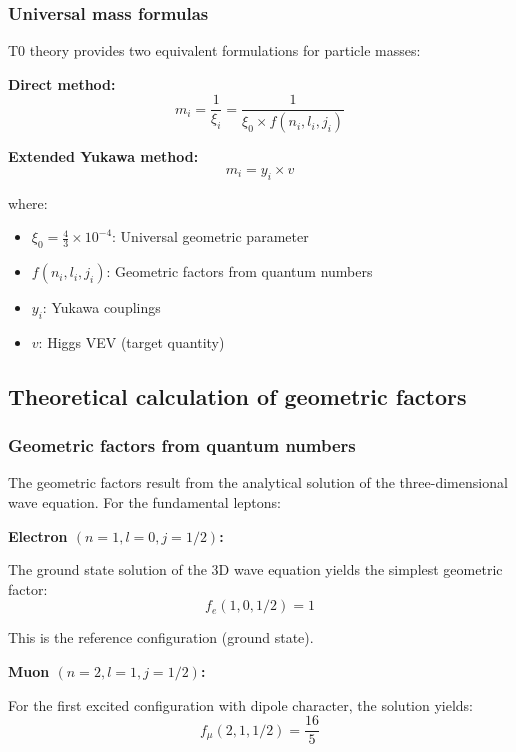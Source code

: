 \subsubsection{Universal mass formulas}

T0 theory provides two equivalent formulations for particle masses:

\textbf{Direct method:}
\begin{equation}
	m_i = \frac{1}{\xi_i} = \frac{1}{\xi_0 \times f(n_i, l_i, j_i)}
	\label{eq:direct_mass_formula}
\end{equation}

\textbf{Extended Yukawa method:}
\begin{equation}
	m_i = y_i \times v
	\label{eq:yukawa_mass_formula}
\end{equation}

where:
\begin{itemize}
	\item $\xi_0 = \frac{4}{3} \times 10^{-4}$: Universal geometric parameter
	\item $f(n_i, l_i, j_i)$: Geometric factors from quantum numbers
	\item $y_i$: Yukawa couplings
	\item $v$: Higgs VEV (target quantity)
\end{itemize}

\subsection{Theoretical calculation of geometric factors}

\subsubsection{Geometric factors from quantum numbers}

The geometric factors result from the analytical solution of the three-dimensional wave equation. For the fundamental leptons:

\textbf{Electron $(n=1, l=0, j=1/2)$:}

The ground state solution of the 3D wave equation yields the simplest geometric factor:
\begin{equation}
	f_e(1,0,1/2) = 1
\end{equation}

This is the reference configuration (ground state).

\textbf{Muon $(n=2, l=1, j=1/2)$:}

For the first excited configuration with dipole character, the solution yields:
\begin{equation}
	f_\mu(2,1,1/2) = \frac{16}{5}
\end{equation}

